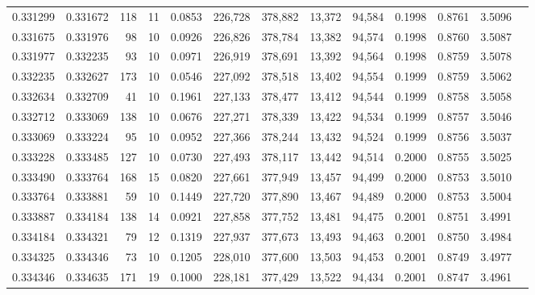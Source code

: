 \begin{tabular}{rrrrrrrrrrrrr}
0.331299 & 0.331672 &   118 &  11 &                                     0.0853 & 226,728 & 378,882 &  13,372 &  94,584 & 0.1998 & 0.8761 & 3.5096 \\
0.331675 & 0.331976 &    98 &  10 &                                     0.0926 & 226,826 & 378,784 &  13,382 &  94,574 & 0.1998 & 0.8760 & 3.5087 \\
0.331977 & 0.332235 &    93 &  10 &                                     0.0971 & 226,919 & 378,691 &  13,392 &  94,564 & 0.1998 & 0.8759 & 3.5078 \\
0.332235 & 0.332627 &   173 &  10 &                                     0.0546 & 227,092 & 378,518 &  13,402 &  94,554 & 0.1999 & 0.8759 & 3.5062 \\
0.332634 & 0.332709 &    41 &  10 &                                     0.1961 & 227,133 & 378,477 &  13,412 &  94,544 & 0.1999 & 0.8758 & 3.5058 \\
0.332712 & 0.333069 &   138 &  10 &                                     0.0676 & 227,271 & 378,339 &  13,422 &  94,534 & 0.1999 & 0.8757 & 3.5046 \\
0.333069 & 0.333224 &    95 &  10 &                                     0.0952 & 227,366 & 378,244 &  13,432 &  94,524 & 0.1999 & 0.8756 & 3.5037 \\
0.333228 & 0.333485 &   127 &  10 &                                     0.0730 & 227,493 & 378,117 &  13,442 &  94,514 & 0.2000 & 0.8755 & 3.5025 \\
0.333490 & 0.333764 &   168 &  15 &                                     0.0820 & 227,661 & 377,949 &  13,457 &  94,499 & 0.2000 & 0.8753 & 3.5010 \\
0.333764 & 0.333881 &    59 &  10 &                                     0.1449 & 227,720 & 377,890 &  13,467 &  94,489 & 0.2000 & 0.8753 & 3.5004 \\
0.333887 & 0.334184 &   138 &  14 &                                     0.0921 & 227,858 & 377,752 &  13,481 &  94,475 & 0.2001 & 0.8751 & 3.4991 \\
0.334184 & 0.334321 &    79 &  12 &                                     0.1319 & 227,937 & 377,673 &  13,493 &  94,463 & 0.2001 & 0.8750 & 3.4984 \\
0.334325 & 0.334346 &    73 &  10 &                                     0.1205 & 228,010 & 377,600 &  13,503 &  94,453 & 0.2001 & 0.8749 & 3.4977 \\
0.334346 & 0.334635 &   171 &  19 &                                     0.1000 & 228,181 & 377,429 &  13,522 &  94,434 & 0.2001 & 0.8747 & 3.4961 \\

\end{tabular}
